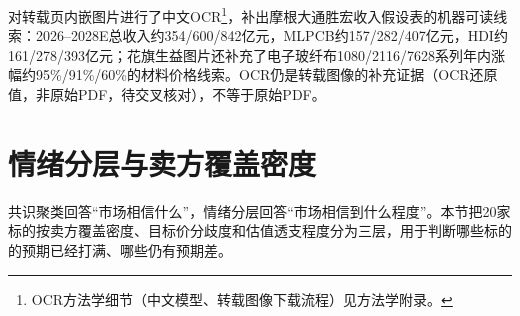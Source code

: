 对转载页内嵌图片进行了中文OCR\footnote{OCR方法学细节（中文模型、转载图像下载流程）见方法学附录。}，补出摩根大通胜宏收入假设表的机器可读线索：2026--2028E总收入约354/600/842亿元，MLPCB约157/282/407亿元，HDI约161/278/393亿元；花旗生益图片还补充了电子玻纤布1080/2116/7628系列年内涨幅约95\%/91\%/60\%的材料价格线索。OCR仍是转载图像的补充证据（OCR还原值，非原始PDF，待交叉核对），不等于原始PDF。

\section{情绪分层与卖方覆盖密度}

共识聚类回答``市场相信什么''，情绪分层回答``市场相信到什么程度''。本节把20家标的按卖方覆盖密度、目标价分歧度和估值透支程度分为三层，用于判断哪些标的的预期已经打满、哪些仍有预期差。

